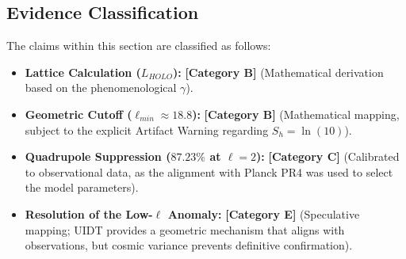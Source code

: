 \subsection*{Evidence Classification}
The claims within this section are classified as follows:
\begin{itemize}
    \item \textbf{Lattice Calculation ($L_{HOLO}$):} \textbf{[Category B]} (Mathematical derivation based on the phenomenological $\gamma$).
    \item \textbf{Geometric Cutoff ($\ell_{min} \approx 18.8$):} \textbf{[Category B]} (Mathematical mapping, subject to the explicit Artifact Warning regarding $S_h = \ln(10)$).
    \item \textbf{Quadrupole Suppression ($87.23\%$ at $\ell=2$):} \textbf{[Category C]} (Calibrated to observational data, as the alignment with Planck PR4 was used to select the model parameters).
    \item \textbf{Resolution of the Low-$\ell$ Anomaly:} \textbf{[Category E]} (Speculative mapping; UIDT provides a geometric mechanism that aligns with observations, but cosmic variance prevents definitive confirmation).
\end{itemize}
